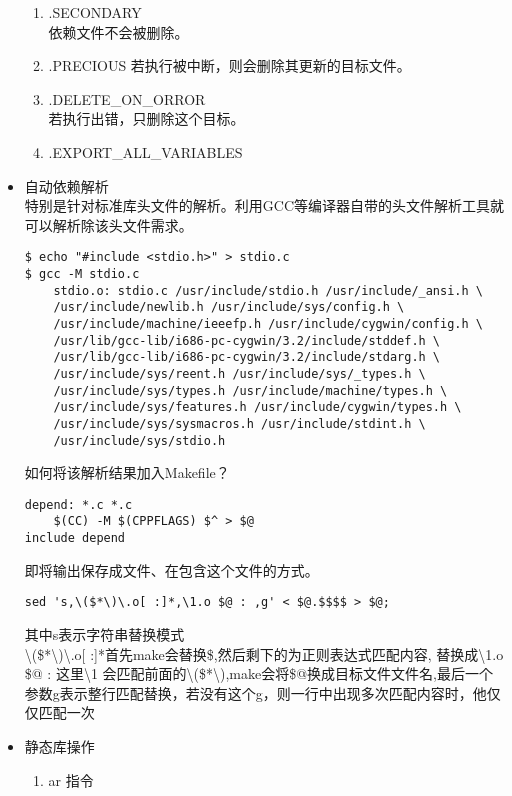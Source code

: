 \begin{itemize}
\begin{enumerate}
				\item .SECONDARY \\
				依赖文件不会被删除。
				\item .PRECIOUS
				若执行被中断，则会删除其更新的目标文件。
				\item .DELETE\_ON\_ORROR\\
				若执行出错，只删除这个目标。
				\item .EXPORT\_ALL\_VARIABLES
			\end{enumerate}
		\item 自动依赖解析\\
		特别是针对标准库头文件的解析。利用GCC等编译器自带的头文件解析工具就可以解析除该头文件需求。\\
\cite[page.37]{MecklenburgNovember2004}
\begin{lstlisting}
$ echo "#include <stdio.h>" > stdio.c
$ gcc -M stdio.c
	stdio.o: stdio.c /usr/include/stdio.h /usr/include/_ansi.h \
	/usr/include/newlib.h /usr/include/sys/config.h \
	/usr/include/machine/ieeefp.h /usr/include/cygwin/config.h \
	/usr/lib/gcc-lib/i686-pc-cygwin/3.2/include/stddef.h \
	/usr/lib/gcc-lib/i686-pc-cygwin/3.2/include/stdarg.h \
	/usr/include/sys/reent.h /usr/include/sys/_types.h \
	/usr/include/sys/types.h /usr/include/machine/types.h \
	/usr/include/sys/features.h /usr/include/cygwin/types.h \
	/usr/include/sys/sysmacros.h /usr/include/stdint.h \
	/usr/include/sys/stdio.h
\end{lstlisting}
	如何将该解析结果加入Makefile？\\
\cite[page.39]{MecklenburgNovember2004} 
\begin{lstlisting}
depend: *.c *.c
	$(CC) -M $(CPPFLAGS) $^ > $@
include depend
\end{lstlisting}
	即将输出保存成文件、在包含这个文件的方式。
\begin{lstlisting}
sed 's,\($*\)\.o[ :]*,\1.o $@ : ,g' < $@.$$$$ > $@;
\end{lstlisting}
	其中s表示字符串替换模式\\
	\textbackslash (\$*\textbackslash)\textbackslash.o[ :]*首先make会替换\$,然后剩下的为正则表达式匹配内容,
	替换成\textbackslash 1.o \$@ : 这里\textbackslash1 会匹配前面的\textbackslash (\$*\textbackslash),make会将\$@换成目标文件文件名,最后一个参数g表示整行匹配替换，若没有这个g，则一行中出现多次匹配内容时，他仅仅匹配一次
	\item 静态库操作\\
		\begin{enumerate}
			\item ar 指令\\

\end{enumerate}
\end{itemize}
